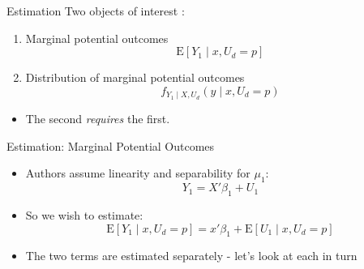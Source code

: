 \documentclass{beamer}
\begin{document}
\begin{frame}{Estimation}
  Two objects of interest :
\begin{enumerate}
\item Marginal potential outcomes
\begin{equation*}
  \mathrm{E}[Y_1\mid x,U_d=p]
\end{equation*}
\item Distribution of marginal potential outcomes
  \begin{equation*}
    f_{Y_1\mid X,U_d}(y\mid x,U_d=p)
  \end{equation*}
\end{enumerate}
\begin{itemize}
\item The second \textit{requires} the first.
\end{itemize}

\end{frame}


\begin{frame}{Estimation: Marginal Potential Outcomes  }
  \begin{itemize}
  \item Authors assume linearity and separability for $\mu_1$:
    \begin{equation*}
      Y_1  = X'\beta_1 +  U_1
    \end{equation*}
\item So we wish to estimate:
    \begin{equation*}
      \mathrm{E}[Y_1\mid x,U_d=p]  = x'\beta_1 +  \mathrm{E}[U_1\mid x,U_d=p]
    \end{equation*}
\item The two terms are estimated separately - let's look at each in turn
  \end{itemize}
\end{frame}
\end{document}
